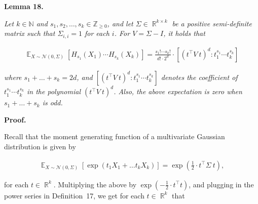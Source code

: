 \documentclass[10pt,a4paper]{article}
\begin{document}




\par\medskip\noindent\textbf{
\textbf{Lemma 18}\textbf{.}
}\par



\emph{Let $k\in\mathbb{N}$ and $s_{1},s_{2},\dots,s_{k}\in\mathbb{Z}_{\geqslant 0}$, and let $\Sigma\in\mathop{\mathbb{R}}^{k\times k}$ be a positive semi-definite matrix such that $\Sigma_{i,i}=1$ for each $i$. For $V=\Sigma-I$, it holds that}\par


\[\begin{gathered}
\mathop{\mathbb{E}}_{X\sim\mathcal{N}(0,\Sigma)}\left[H_{s_{1}}(X_{1})\cdots H_{s_{k}}(X_{k})\right]=\frac{s_{1}!\cdots s_{k}!}{d!\cdot 2^{d}}\cdot\left[\left(t^{\top}V\ t\right)^{d}:t_{1}^{s_{1}}\cdots t_{k}^{s_{k}}\right]
\end{gathered}\]


\emph{where $s_{1}+\dots+s_{k}=2d$, and $\left[\left(t^{\top}V\ t\right)^{d}:t_{1}^{s_{1}}\cdots t_{k}^{s_{k}}\right]$ denotes the coefficient of $t_{1}^{s_{1}}\cdots t_{k}^{s_{k}}$ in the polynomial $\left(t^{\top}V\ t\right)^{d}$.
Also, the above expectation is zero when $s_{1}+\dots+s_{k}$ is odd.}\par







\par\medskip\noindent\textbf{Proof.}\par




Recall that the moment generating function of a multivariate Gaussian distribution is given by\par


\[\begin{gathered}
\mathop{\mathbb{E}}_{X\sim\mathcal{N}(0,\Sigma)}\left[\exp\left(t_{1}X_{1}+\dots t_{k}X_{k}\right)\right]=\exp\left(\frac{1}{2}\cdot t^{\top}\Sigma\ t\right),
\end{gathered}\]


for each $t\in\mathop{\mathbb{R}}^{k}$.
Multiplying the above by $\exp(-\frac{1}{2}\cdot t^{\top}t)$, and plugging in the power series in Definition 17, we get for each $t\in\mathop{\mathbb{R}}^{k}$ that\par
\end{document}
